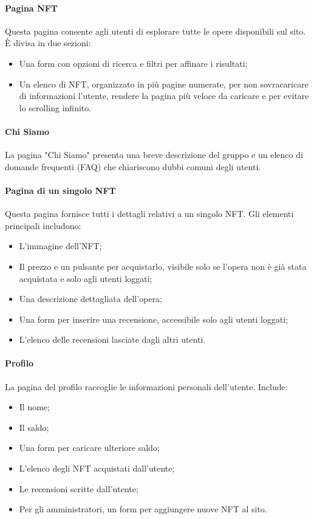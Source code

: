 \documentclass[10pt]{article}
\begin{document}
\paragraph{Pagina NFT} Questa pagina consente agli utenti di esplorare tutte le opere disponibili sul sito. È divisa in due sezioni:
\begin{itemize}
    \item Una form con opzioni di ricerca e filtri per affinare i risultati;
    \item Un elenco di NFT, organizzato in più pagine numerate, per non sovracaricare di informazioni l'utente, rendere la pagina più veloce da caricare e per evitare lo scrolling infinito.
\end{itemize}

\paragraph{Chi Siamo} La pagina "Chi Siamo" presenta una breve descrizione del gruppo e un elenco di domande frequenti (FAQ) che chiariscono dubbi comuni degli utenti.

\paragraph{Pagina di un singolo NFT} Questa pagina fornisce tutti i dettagli relativi a un singolo NFT. Gli elementi principali includono:
\begin{itemize}
    \item L’immagine dell’NFT;
    \item Il prezzo e un pulsante per acquistarlo, visibile solo se l'opera non è già stata acquistata e solo agli utenti loggati;
    \item Una descrizione dettagliata dell’opera;
    \item Una form per inserire una recensione, accessibile solo agli utenti loggati;
    \item L’elenco delle recensioni lasciate dagli altri utenti.
\end{itemize}

\paragraph{Profilo} La pagina del profilo raccoglie le informazioni personali dell’utente. Include:
\begin{itemize}
    \item Il nome;
    \item Il saldo;
    \item Una form per caricare ulteriore saldo;
    \item L’elenco degli NFT acquistati dall’utente;
    \item Le recensioni scritte dall’utente;
    \item Per gli amministratori, un form per aggiungere nuove NFT al sito.
\end{itemize}
\end{document}
